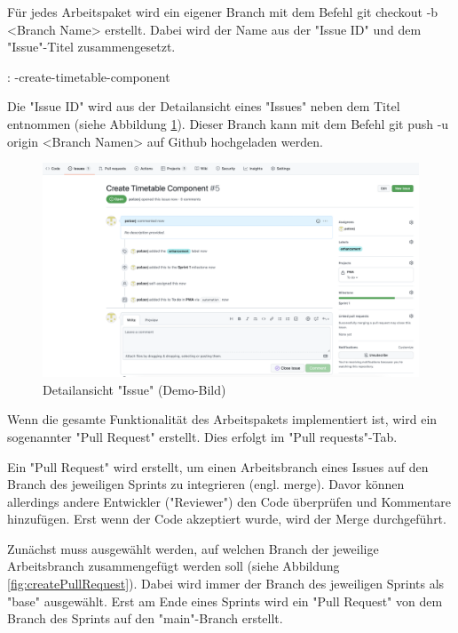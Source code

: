 
Für jedes Arbeitspaket wird ein eigener Branch mit dem Befehl {\ttfamily git checkout -b <Branch Name>} erstellt. Dabei wird der Name aus der "Issue ID" und dem "Issue"-Titel zusammengesetzt. 

\zb:
{-create-timetable-component}

Die "Issue ID" wird aus der Detailansicht eines "Issues" neben dem Titel entnommen (siehe Abbildung \ref{fig:issueInfo}). Dieser Branch kann mit dem Befehl {\ttfamily git push -u origin <Branch Namen>} auf Github hochgeladen werden. 

\begin{figure}[H]
    \centering
    \includegraphics[width=\textwidth]{media/ProjectManagement/IssueInfo.png}
    \caption{Detailansicht "Issue" (Demo-Bild)}
    \label{fig:issueInfo}
\end{figure}


Wenn die gesamte Funktionalität des Arbeitspakets implementiert ist, wird ein sogenannter "Pull Request" erstellt. Dies erfolgt im "Pull requests"-Tab. 

Ein "Pull Request" wird erstellt, um einen Arbeits\-branch eines Issues auf den Branch des jeweiligen Sprints zu integrieren (engl. merge). Davor können allerdings andere Entwickler ("Reviewer") den Code überprüfen und Kommentare hinzufügen. Erst wenn der Code akzeptiert wurde, wird der Merge durchgeführt.

Zunächst muss ausgewählt werden, auf welchen Branch der jeweilige Arbeits\-branch zusammengefügt werden soll (siehe Abbildung \ref{fig:createPullRequest}). 
Dabei wird immer der Branch des jeweiligen Sprints als "base" ausgewählt. 
Erst am Ende eines Sprints wird ein "Pull Request" von dem Branch des Sprints auf den "main"-Branch erstellt.

